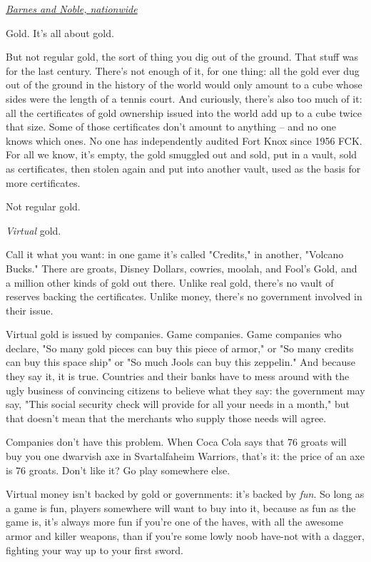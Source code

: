 \emph{\href{http://search.barnesandnoble.com/Little-Brother/Cory-Doctorow/e/9780765322166/?itm=6}{Barnes and Noble, nationwide}}

Gold. It's all about gold.

But not regular gold, the sort of thing you dig out of the ground.
That stuff was for the last century. There's not enough of it, for
one thing: all the gold ever dug out of the ground in the history
of the world would only amount to a cube whose sides were the
length of a tennis court. And curiously, there's also too much of
it: all the certificates of gold ownership issued into the world
add up to a cube twice that size. Some of those certificates don't
amount to anything -- and no one knows which ones. No one has
independently audited Fort Knox since 1956 FCK. For all we know,
it's empty, the gold smuggled out and sold, put in a vault, sold as
certificates, then stolen again and put into another vault, used as
the basis for more certificates.

Not regular gold.

\emph{Virtual} gold.

Call it what you want: in one game it's called "Credits," in
another, "Volcano Bucks." There are groats, Disney Dollars,
cowries, moolah, and Fool's Gold, and a million other kinds of gold
out there. Unlike real gold, there's no vault of reserves backing
the certificates. Unlike money, there's no government involved in
their issue.

Virtual gold is issued by companies. Game companies. Game companies
who declare, "So many gold pieces can buy this piece of armor," or
"So many credits can buy this space ship" or "So much Jools can buy
this zeppelin." And because they say it, it is true. Countries and
their banks have to mess around with the ugly business of
convincing citizens to believe what they say: the government may
say, "This social security check will provide for all your needs in
a month," but that doesn't mean that the merchants who supply those
needs will agree.

Companies don't have this problem. When Coca Cola says that 76
groats will buy you one dwarvish axe in Svartalfaheim Warriors,
that's it: the price of an axe is 76 groats. Don't like it? Go play
somewhere else.

Virtual money isn't backed by gold or governments: it's backed by
\emph{fun}. So long as a game is fun, players somewhere will want
to buy into it, because as fun as the game is, it's always more fun
if you're one of the haves, with all the awesome armor and killer
weapons, than if you're some lowly noob have-not with a dagger,
fighting your way up to your first sword.


